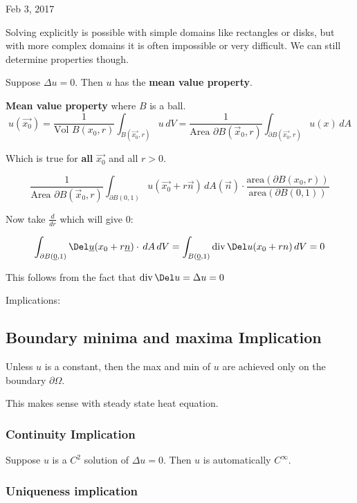 \documentclass[main.tex]{subfiles}
\begin{document}
\hrulefill{}

Feb 3, 2017

\vspace{3mm}

Solving explicitly is possible with simple domains like rectangles or disks, but with more complex domains it is often impossible or very difficult. We can still determine properties though.

Suppose $\Delta u = 0$. Then $u$ has the \textbf{mean value property}.

\textbf{Mean value property} where $B$ is a ball.
\begin{equation}
\label{eq:mean-value}
u(\vec{x_0}) = \frac{1}{\textrm{Vol }B(x_0, r)}\int_{B(\vec{x_0}, r)} u\,dV = \frac{1}{\textrm{Area }\partial B(\vec{x}_0, r)} \int_{\partial B(\vec{x_0}, r)} u(x)\,dA
\end{equation}

Which is true for \textbf{all} $\vec{x_0}$ and all $r > 0$.

$$\frac{1}{\textrm{Area }\partial B(\vec{x}_0, r)} \int_{\partial B(0, 1)} u(\vec{x_0} + r\vec{n})\,dA(\vec{n})\cdot \frac{\textrm{area}(\partial B(x_0, r))}{\textrm{area}(\partial B(0, 1))}$$

Now take $\frac{d}{dr}$ which will give $0$:

$$\int_{\partial B(\vec{0}, 1)} \Del \vec{u}(x_0 + r\vec{n}) \cdot \,dA\,dV = \int_{B(\vec{0}, 1)} \divg{\Del u(x_0 + rn)} \, dV = 0$$

This follows from the fact that $\divg{\Del u} = \Delta u = 0$

Implications:

\subsection{Boundary minima and maxima Implication}
Unless $u$ is a constant, then the max and min of $u$ are achieved only on the boundary $\partial \Omega$.

This makes sense with steady state heat equation.

\subsubsection{Continuity Implication}

Suppose $u$ is a $C^2$ solution of $\Delta u = 0$. Then $u$ is automatically $C^\infty$.

\subsubsection{Uniqueness implication}
\end{document}
